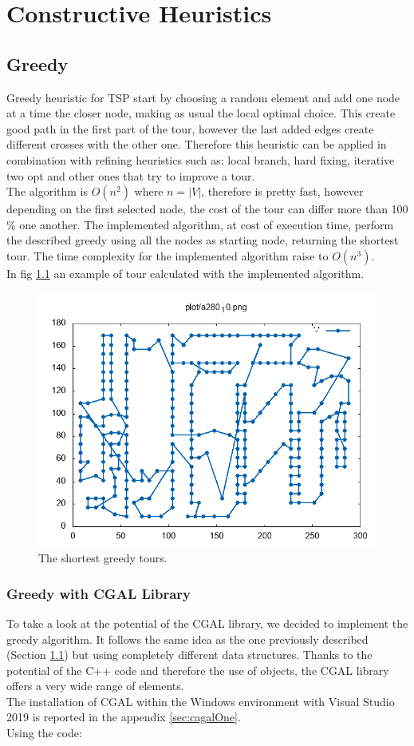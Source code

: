 \chapter{Constructive Heuristics}

\section{Greedy}\label{sec:greedy}
Greedy heuristic for TSP start by choosing a random element and add one node at a time the closer node, making as usual the local optimal choice. This create good path in the first part of the tour, however the last added edges create different crosses with the other one. Therefore this heuristic can be applied in combination with refining heuristics such as: local branch, hard fixing, iterative two opt and other ones that try to improve a tour.\\
The algorithm is $ O(n^2) $ where $ n = |V| $, therefore is pretty fast, however depending on the first selected node, the cost of the tour can differ more than 100 \% one another. The implemented algorithm, at cost of execution time, perform the described greedy using all the nodes as starting node, returning the shortest tour. The time complexity for the implemented algorithm raise to $ O(n^3) $.\\
In fig \ref{fig:a280_10_} an example of tour calculated with the implemented algorithm.

\begin{figure}[h]
	\centering
	\centering
	\includegraphics[width=0.7\columnwidth]{../res/a280_10.png}
	\caption{The shortest greedy tours.}
	\label{fig:a280_10_}
\end{figure}



\subsection{Greedy with CGAL Library}
To take a look at the potential of the CGAL library, we decided to implement the greedy algorithm. It follows the same idea as the one previously described (Section \ref{sec:greedy}) but using completely different data structures. Thanks to the potential of the C++ code and therefore the use of objects, the CGAL library offers a very wide range of elements.\\ 
The installation of CGAL within the Windows environment with Visual Studio 2019 is reported in the appendix \ref{sec:cagalOne}.\\
Using the code:


